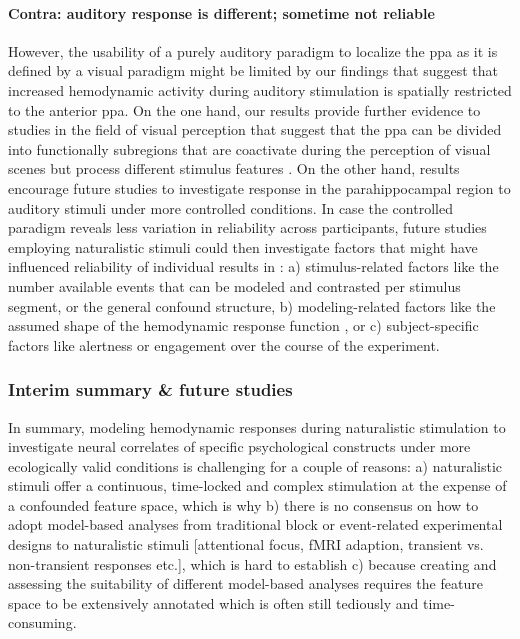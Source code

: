 \paragraph{Contra: auditory response is different; sometime not reliable}

%
However, the usability of a purely auditory paradigm to localize the \ac{ppa} as
it is defined by a visual paradigm might be limited by our findings that suggest
that increased hemodynamic activity during auditory stimulation is spatially
restricted to the anterior \ac{ppa}.
%
On the one hand, our results provide further evidence to studies in the field of
visual perception that suggest that the \ac{ppa} can be divided into
functionally subregions that are coactivate during the perception of visual
scenes but process different stimulus features
\citep{aminoff2007parahippocampal, baldassano2013differential}.
%
On the other hand, results encourage future studies to investigate response in
the parahippocampal region to auditory stimuli under more controlled conditions.
%
In case the controlled paradigm reveals less variation in reliability across
participants, future studies employing naturalistic stimuli could then
investigate factors that might have influenced reliability of individual results
in \citet{haeusler2022processing}:
%
a) stimulus-related factors like the number available events that can be modeled
and contrasted per stimulus segment, or the general confound structure,
%
b) modeling-related factors like the assumed shape of the hemodynamic response
function , or
%
c) subject-specific factors like alertness or engagement over the course of the
experiment.



\subsubsection{Interim summary \& future studies}




%
In summary, modeling hemodynamic responses during naturalistic stimulation to
investigate neural correlates of specific psychological constructs under more
ecologically valid conditions is challenging for a couple of reasons:
%
a) naturalistic stimuli offer a continuous, time-locked and complex stimulation
at the expense of a confounded feature space, which is why
%
b) there is no consensus on how to adopt model-based analyses from traditional
block or event-related experimental designs to naturalistic stimuli [attentional
focus, fMRI adaption, transient vs. non-transient responses etc.], which is hard
to establish
%
c) because creating and assessing the suitability of different model-based
analyses requires the feature space to be extensively annotated which is often
still tediously and time-consuming.


